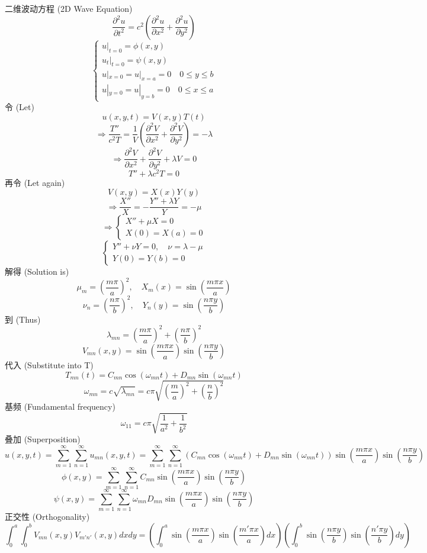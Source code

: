 \documentclass{article}
\begin{document}
	二维波动方程 (2D Wave Equation)
	$$
	\frac{\partial^2 u}{\partial t^2} = c^2 (\frac{\partial^2 u}{\partial x^2} + \frac{\partial^2 u}{\partial y^2})
	$$
	$$
	\begin{cases}
		u|_{t=0} = \phi(x,y) \\
		u_t|_{t=0} = \psi(x,y) \\
		u|_{x=0} = u|_{x=a} = 0 \quad 0 \le y \le b \\
		u|_{y=0} = u|_{y=b} = 0 \quad 0 \le x \le a
	\end{cases}
	$$
	令 (Let)
	$$
	u(x,y,t) = V(x,y)T(t)
	$$
	$$
	\Rightarrow \frac{T''}{c^2 T} = \frac{1}{V}(\frac{\partial^2 V}{\partial x^2} + \frac{\partial^2 V}{\partial y^2}) = -\lambda
	$$
	$$
	\Rightarrow \frac{\partial^2 V}{\partial x^2} + \frac{\partial^2 V}{\partial y^2} + \lambda V = 0
	$$
	$$
	T'' + \lambda c^2 T = 0
	$$
	再令 (Let again)
	$$
	V(x,y) = X(x)Y(y)
	$$
	$$
	\Rightarrow \frac{X''}{X} = -\frac{Y''+\lambda Y}{Y} = -\mu
	$$
	$$
	\Rightarrow \begin{cases}
		X''+\mu X=0 \\
		X(0)=X(a)=0
	\end{cases}
	$$
	$$
	\begin{cases}
		Y''+\nu Y=0, \quad \nu = \lambda - \mu \\
		Y(0)=Y(b)=0
	\end{cases}
	$$
	解得 (Solution is)
	$$
	\mu_m = (\frac{m\pi}{a})^2, \quad X_m(x) = \sin(\frac{m\pi x}{a})
	$$
	$$
	\nu_n = (\frac{n\pi}{b})^2, \quad Y_n(y) = \sin(\frac{n\pi y}{b})
	$$
	到 (Thus)
	$$
	\lambda_{mn} = (\frac{m\pi}{a})^2 + (\frac{n\pi}{b})^2
	$$
	$$
	V_{mn}(x,y) = \sin(\frac{m\pi x}{a}) \sin(\frac{n\pi y}{b})
	$$
	代入 (Substitute into T)
	$$
	T_{mn}(t) = C_{mn} \cos(\omega_{mn} t) + D_{mn} \sin(\omega_{mn} t)
	$$
	$$
	\omega_{mn} = c \sqrt{\lambda_{mn}} = c\pi \sqrt{(\frac{m}{a})^2 + (\frac{n}{b})^2}
	$$
	基频 (Fundamental frequency)
	$$
	\omega_{11} = c\pi \sqrt{\frac{1}{a^2} + \frac{1}{b^2}}
	$$
	叠加 (Superposition)
	$$
	u(x,y,t) = \sum_{m=1}^{\infty} \sum_{n=1}^{\infty} u_{mn}(x,y,t) = \sum_{m=1}^{\infty} \sum_{n=1}^{\infty} (C_{mn} \cos(\omega_{mn} t) + D_{mn} \sin(\omega_{mn} t)) \sin(\frac{m\pi x}{a})\sin(\frac{n\pi y}{b})
	$$
	$$
	\phi(x,y) = \sum_{m=1}^{\infty} \sum_{n=1}^{\infty} C_{mn} \sin(\frac{m\pi x}{a})\sin(\frac{n\pi y}{b})
	$$
	$$
	\psi(x,y) = \sum_{m=1}^{\infty} \sum_{n=1}^{\infty} \omega_{mn} D_{mn} \sin(\frac{m\pi x}{a})\sin(\frac{n\pi y}{b})
	$$
	正交性 (Orthogonality)
	$$
	\int_0^a \int_0^b V_{mn}(x,y) V_{m'n'}(x,y) dx dy = (\int_0^a \sin(\frac{m\pi x}{a})\sin(\frac{m'\pi x}{a}) dx)(\int_0^b \sin(\frac{n\pi y}{b})\sin(\frac{n'\pi y}{b}) dy)
	$$
\end{document}
